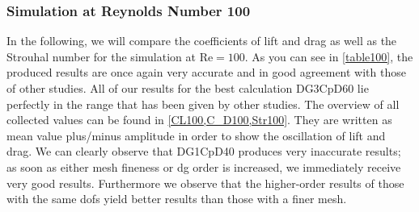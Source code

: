 	\subsubsection{Simulation at Reynolds Number 100}
	In the following, we will compare the coefficients of lift and drag as well as the Strouhal number for the simulation at $\text{Re}=100$. As you can see in \cref{table100}, the produced results are once again very accurate and in good agreement with those of other studies. All of our results for the best calculation DG3CpD60 lie perfectly in the range that has been given by other studies.  The overview of all collected values can be found in \cref{CL100,C_D100,Str100}. They are written as mean value plus/minus amplitude in order to show the oscillation of lift and drag. We can clearly observe that DG1CpD40 produces very inaccurate results; as soon as either mesh fineness or \gls{dg} order is increased, we immediately receive very good results. Furthermore we observe that the higher-order results of those with the same \gls{dof}s yield better results than those with a finer mesh.
